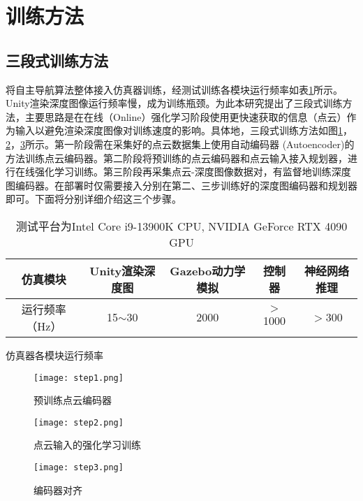 \section{训练方法}
\subsection{三段式训练方法}
将自主导航算法整体接入仿真器训练，经测试训练各模块运行频率如表\ref{train_freq}所示。Unity渲染深度图像运行频率慢，成为训练瓶颈。为此本研究提出了三段式训练方法，主要思路是在在线（Online）强化学习阶段使用更快速获取的信息（点云）作为输入以避免渲染深度图像对训练速度的影响。具体地，三段式训练方法如图\ref{fig_step1}，\ref{fig_step2}，\ref{fig_step3}所示。第一阶段需在采集好的点云数据集上使用自动编码器 (Autoencoder)的方法训练点云编码器。第二阶段将预训练的点云编码器和点云输入接入规划器，进行在线强化学习训练。第三阶段再采集点云-深度图像数据对，有监督地训练深度图编码器。在部署时仅需要接入分别在第二、三步训练好的深度图编码器和规划器即可。下面将分别详细介绍这三个步骤。
\begin{table}
  \centering
  \begin{tabular}{ccccc}
      \hline
      \textbf{仿真模块} & \textbf{Unity渲染深度图} & \textbf{Gazebo动力学模拟} & \textbf{控制器} & \textbf{神经网络推理} \\ \hline
      运行频率（Hz） & 15$\sim$30 & 2000 & $>$1000 & $>$300 \\ \hline
  \end{tabular}
  \caption{仿真器各模块运行频率}
  \caption*{测试平台为Intel Core i9-13900K CPU, NVIDIA GeForce RTX 4090 GPU}
  \label{train_freq}
\end{table}

\begin{figure}
  \centering
  \texttt{[image: step1.png]}
  \caption{预训练点云编码器}
  \label{fig_step1}
\end{figure}

\begin{figure}
  \centering
  \texttt{[image: step2.png]}
  \caption{点云输入的强化学习训练}
  \label{fig_step2}
\end{figure}

\begin{figure}
  \centering
  \texttt{[image: step3.png]}
  \caption{编码器对齐}
  \label{fig_step3}
\end{figure}

